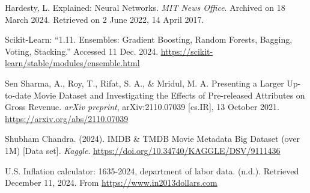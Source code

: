 \documentclass{article}
\begin{document}

\begin{hangparas}{.25in}{1} %
\hypertarget{Hardesty2017}{Hardesty, L. Explained: Neural Networks. \textit{MIT News Office}. Archived on 18 March 2024. Retrieved on 2 June 2022, 14 April 2017.}
\end{hangparas}

\begin{hangparas}{.25in}{1}
\hypertarget{Scikit-Learn}{Scikit-Learn: “1.11. Ensembles: Gradient Boosting, Random Forests, Bagging, Voting, Stacking.” Accessed 11 Dec. 2024. \url{https://scikit-learn/stable/modules/ensemble.html}}
\end{hangparas}

\begin{hangparas}{.25in}{1}
\hypertarget{SenSharma2021}{Sen Sharma, A., Roy, T., Rifat, S. A., \& Mridul, M. A. Presenting a Larger Up-to-date Movie Dataset and Investigating the Effects of Pre-released Attributes on Gross Revenue. \textit{arXiv preprint}, arXiv:2110.07039 [cs.IR], 13 October 2021. \url{https://arxiv.org/abs/2110.07039}}
\end{hangparas}

\begin{hangparas}{.25in}{1}
\hypertarget{Shubham2024}{Shubham Chandra. (2024). IMDB \& TMDB Movie Metadata Big Dataset (over 1M) [Data set]. \textit{Kaggle}. \url{https://doi.org/10.34740/KAGGLE/DSV/9111436}}
\end{hangparas}

\begin{hangparas}{.25in}{1}
\hypertarget{}{U.S. Inflation calculator: 1635-2024, department of labor data. (n.d.). Retrieved December 11, 2024. From
\url{https://www.in2013dollars.com}}
\end{hangparas}


\end{document}
